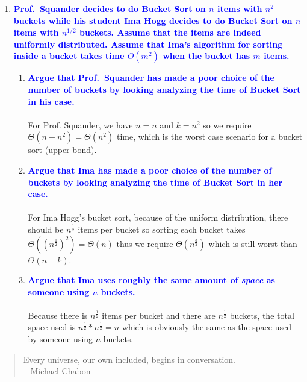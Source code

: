 \documentclass{article}
\begin{document}
\begin{enumerate}
\item \textbf{\textcolor{blue}{Prof.\ Squander decides to do Bucket Sort on $n$ items with $n^2$ buckets while
his student Ima Hogg decides to do Bucket Sort on $n$ items with $n^{1/2}$ buckets.
Assume that the items are indeed uniformly distributed.  Assume that Ima's algorithm
for sorting inside a bucket takes time $O(m^2)$ when the bucket has $m$ items.}}
    \begin{enumerate}
    \item \textbf{\textcolor{blue}{Argue that Prof.\ Squander has made a poor choice of the number of buckets by
    looking analyzing the time of Bucket Sort in his case.}}
        \\\\ For Prof. Squander, we have $n=n$ and $k=n^2$ so we require $\Theta(n + n^2)=\Theta(n^2)$ time, which is the worst case scenario for a bucket sort (upper bond).
    \item \textbf{\textcolor{blue}{Argue that Ima has made a poor choice of the number of buckets by looking analyzing the time of Bucket Sort in her case.}}
        \\\\ For Ima Hogg's bucket sort, because of the uniform distribution, there should be $n^\frac{1}{2}$ items per bucket so sorting each bucket takes $\Theta((n^\frac{1}{2})^2)=\Theta(n)$ thus we require $\Theta(n^\frac{3}{2})$ which is still worst than $\Theta(n + k)$.
    \item \textbf{\textcolor{blue}{Argue that Ima uses roughly the same amount of {\em space} as someone
    using $n$ buckets.}}
        \\\\ Because there is $n^\frac{1}{2}$ items per bucket and there are $n^{\frac{1}{2}}$ buckets, the total space used is $n^\frac{1}{2}*n^\frac{1}{2}=n$ which is obviously the same as the space used by someone using $n$ buckets.
    \end{enumerate}
\end{enumerate}

\begin{quote}
Every universe, our own included, begins in conversation.
\\ -- Michael Chabon
\end{quote}
\end{document}
